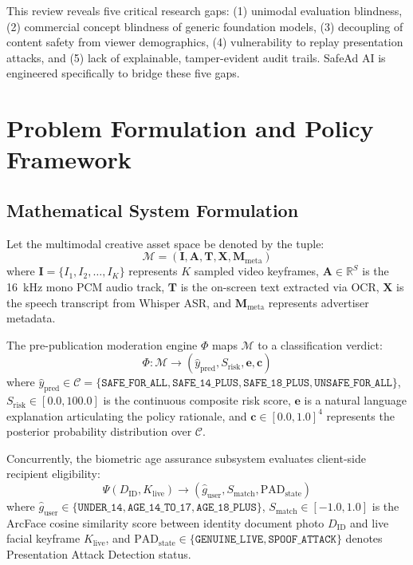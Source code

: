 \documentclass[12pt,a4paper]{report}
\begin{document}
This review reveals five critical research gaps: (1) unimodal evaluation blindness, (2) commercial concept blindness of generic foundation models, (3) decoupling of content safety from viewer demographics, (4) vulnerability to replay presentation attacks, and (5) lack of explainable, tamper-evident audit trails. SafeAd AI is engineered specifically to bridge these five gaps.


\chapter{Problem Formulation and Policy Framework}
\label{ch:policy}

\section{Mathematical System Formulation}
Let the multimodal creative asset space be denoted by the tuple:
\begin{equation}
\mathcal{M} = \left( \mathbf{I}, \mathbf{A}, \mathbf{T}, \mathbf{X}, \mathbf{M}_{\text{meta}} \right)
\end{equation}
where $\mathbf{I} = \{I_1, I_2, \dots, I_K\}$ represents $K$ sampled video keyframes, $\mathbf{A} \in \mathbb{R}^{S}$ is the 16~kHz mono PCM audio track, $\mathbf{T}$ is the on-screen text extracted via OCR, $\mathbf{X}$ is the speech transcript from Whisper ASR, and $\mathbf{M}_{\text{meta}}$ represents advertiser metadata.

The pre-publication moderation engine $\Phi$ maps $\mathcal{M}$ to a classification verdict:
\begin{equation}
\Phi: \mathcal{M} \longrightarrow \left( \hat{y}_{\text{pred}}, S_{\text{risk}}, \mathbf{e}, \mathbf{c} \right)
\end{equation}
where $\hat{y}_{\text{pred}} \in \mathcal{C} = \{\texttt{SAFE\_FOR\_ALL}, \texttt{SAFE\_14\_PLUS}, \texttt{SAFE\_18\_PLUS}, \texttt{UNSAFE\_FOR\_ALL}\}$, $S_{\text{risk}} \in [0.0, 100.0]$ is the continuous composite risk score, $\mathbf{e}$ is a natural language explanation articulating the policy rationale, and $\mathbf{c} \in [0.0, 1.0]^4$ represents the posterior probability distribution over $\mathcal{C}$.

Concurrently, the biometric age assurance subsystem evaluates client-side recipient eligibility:
\begin{equation}
\Psi(D_{\text{ID}}, K_{\text{live}}) \longrightarrow \left( \hat{g}_{\text{user}}, S_{\text{match}}, \text{PAD}_{\text{state}} \right)
\end{equation}
where $\hat{g}_{\text{user}} \in \{\texttt{UNDER\_14}, \texttt{AGE\_14\_TO\_17}, \texttt{AGE\_18\_PLUS}\}$, $S_{\text{match}} \in [-1.0, 1.0]$ is the ArcFace cosine similarity score between identity document photo $D_{\text{ID}}$ and live facial keyframe $K_{\text{live}}$, and $\text{PAD}_{\text{state}} \in \{\texttt{GENUINE\_LIVE}, \texttt{SPOOF\_ATTACK}\}$ denotes Presentation Attack Detection status.
\end{document}
